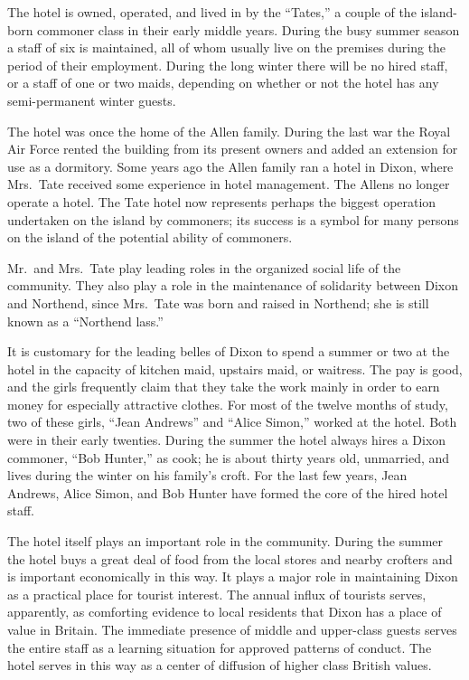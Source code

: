 \documentclass[twoside,symmetric,nobib,justified]{tufte-book}
\begin{document}
The hotel is owned, operated, and lived in by the ``Tates,'' a couple of
the island-born commoner class in their early middle years. During the
busy summer season a staff of six is maintained, all of whom usually
live on the premises during the period of their employment. During the
long winter there will be no hired staff, or a staff of one or two
maids, depending on whether or not the hotel has any semi-permanent
winter guests.

The hotel was once the home of the Allen family. During the last war the
Royal Air Force rented the building from its present owners and added an
extension for use as a dormitory. Some years ago the Allen family ran a
hotel in Dixon, where Mrs.~Tate received some experience in hotel
management. The Allens no longer operate a hotel. The Tate hotel now
represents perhaps the biggest operation undertaken on the island by
commoners; its success is a symbol for many persons on the island of the
potential ability of commoners.

Mr.~and Mrs.~Tate play leading roles in the organized social life of the
community. They also play a role in the maintenance of solidarity
between Dixon and Northend, since Mrs.~Tate was born and raised in
Northend; she is still known as a ``Northend lass.''

It is customary for the leading belles of Dixon to spend a summer or two
at the hotel in the capacity of kitchen maid, upstairs maid, or
waitress. The pay is good, and the girls frequently claim that they take
the work mainly in order to earn money for especially attractive
clothes. For most of the twelve months of study, two of these girls,
``Jean Andrews'' and ``Alice Simon,'' worked at the hotel. Both were in
their early twenties. During the summer the hotel always hires a Dixon
commoner, ``Bob Hunter,'' as cook; he is about thirty years old,
unmarried, and lives during the winter on his family's croft. For the
last few years, Jean Andrews, Alice Simon, and Bob Hunter have formed
the core of the hired hotel staff.

The hotel itself plays an important role in the community. During the
summer the hotel buys a great deal of food from the local stores and
nearby crofters and is important economically in this way. It plays a
major role in maintaining Dixon as a practical place for tourist
interest. The annual influx of tourists serves, apparently, as
comforting evidence to local residents that Dixon has a place of value
in Britain. The immediate presence of middle and upper-class guests
serves the entire staff as a learning situation for approved patterns of
conduct. The hotel serves in this way as a center of diffusion of higher
class British values.
\end{document}
